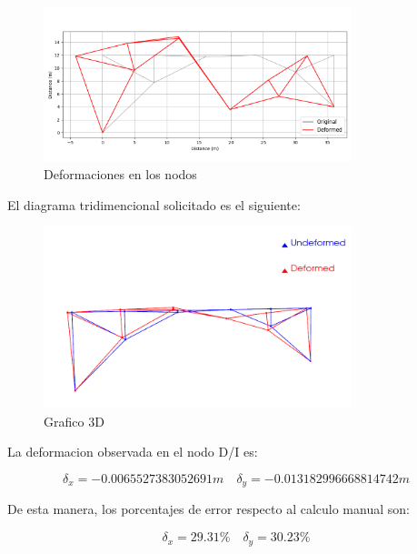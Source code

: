 \begin{figure}[H]
    \centering
    \includegraphics[width=0.8\textwidth]{GRAFICOS/deformed_truss.png}
    \caption{Deformaciones en los nodos}
    \label{fig:deformaciones}
\end{figure}

El diagrama tridimencional solicitado es el siguiente:

\begin{figure}[H]
    \centering
    \includegraphics[width=0.8\textwidth]{GRAFICOS/3D.png}
    \caption{Grafico 3D}
    \label{fig:deformaciones_3D}
\end{figure}

La deformacion observada en el nodo D/I es:

\begin{equation}
    \delta_x = -0.0065527383052691 m \quad \delta_y = -0.013182996668814742 m
\end{equation}

De esta manera, los porcentajes de error respecto al calculo manual son:

\begin{equation}
    \delta_x = 29.31\% \quad \delta_y = 30.23\%
\end{equation}



